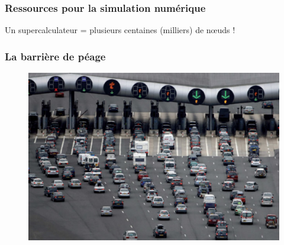 \documentclass[xcolor={usenames,dvipsnames,svgnames,table}, aspectratio=43]{beamer}
\begin{document}
\begin{frame}
\frametitle{Ressources pour la simulation numérique}
  Un supercalculateur
   {
    = plusieurs centaines (milliers) de nœuds !
  }
  \begin{figure}
  \end{figure}
\end{frame}

\begin{frame}
\frametitle{La barrière de péage}
  \begin{figure}
      \includegraphics[width=\textwidth]{graph/peage.pdf}%
  \end{figure}
\end{frame}
\end{document}
